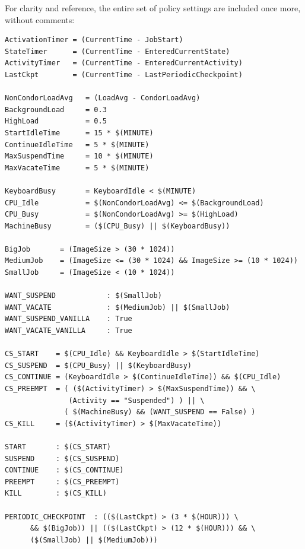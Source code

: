 For clarity and reference, the entire set of policy settings are
included once more, without comments:
\begin{verbatim}
ActivationTimer = (CurrentTime - JobStart)
StateTimer      = (CurrentTime - EnteredCurrentState)
ActivityTimer   = (CurrentTime - EnteredCurrentActivity)
LastCkpt        = (CurrentTime - LastPeriodicCheckpoint)

NonCondorLoadAvg   = (LoadAvg - CondorLoadAvg)
BackgroundLoad     = 0.3
HighLoad           = 0.5
StartIdleTime      = 15 * $(MINUTE)
ContinueIdleTime   = 5 * $(MINUTE)
MaxSuspendTime     = 10 * $(MINUTE)
MaxVacateTime      = 5 * $(MINUTE)

KeyboardBusy       = KeyboardIdle < $(MINUTE)
CPU_Idle           = $(NonCondorLoadAvg) <= $(BackgroundLoad)
CPU_Busy           = $(NonCondorLoadAvg) >= $(HighLoad)
MachineBusy        = ($(CPU_Busy) || $(KeyboardBusy))

BigJob       = (ImageSize > (30 * 1024))
MediumJob    = (ImageSize <= (30 * 1024) && ImageSize >= (10 * 1024))
SmallJob     = (ImageSize < (10 * 1024))

WANT_SUSPEND            : $(SmallJob)
WANT_VACATE             : $(MediumJob) || $(SmallJob)
WANT_SUSPEND_VANILLA    : True
WANT_VACATE_VANILLA     : True

CS_START    = $(CPU_Idle) && KeyboardIdle > $(StartIdleTime)
CS_SUSPEND  = $(CPU_Busy) || $(KeyboardBusy)
CS_CONTINUE = (KeyboardIdle > $(ContinueIdleTime)) && $(CPU_Idle)
CS_PREEMPT  = ( ($(ActivityTimer) > $(MaxSuspendTime)) && \
               (Activity == "Suspended") ) || \
              ( $(MachineBusy) && (WANT_SUSPEND == False) )
CS_KILL     = ($(ActivityTimer) > $(MaxVacateTime))

START       : $(CS_START)
SUSPEND     : $(CS_SUSPEND)
CONTINUE    : $(CS_CONTINUE)
PREEMPT     : $(CS_PREEMPT)
KILL        : $(CS_KILL)

PERIODIC_CHECKPOINT  : (($(LastCkpt) > (3 * $(HOUR))) \
      && $(BigJob)) || (($(LastCkpt) > (12 * $(HOUR))) && \
      ($(SmallJob) || $(MediumJob)))
\end{verbatim}

